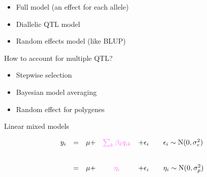 \documentclass[12pt]{article}
\newcommand{\headsize}{\fontsize{35}{35} \selectfont}
\newcommand{\textsize}{\fontsize{30}{35} \selectfont}
\newcommand{\smallsize}{\fontsize{25}{30} \selectfont}
\newcommand{\smallersize}{\fontsize{20}{25} \selectfont}
\begin{document}
\hfill \begin{minipage}{9in}
\color{myblue} \smallersize
\begin{itemize}
\item Full model (an effect for each allele)
\item Diallelic QTL model
\item Random effects model (like BLUP)
\end{itemize}
\end{minipage}

\vspace{20mm}

\color{mywhite}
\smallsize

\hfill \begin{minipage}{9.5in}
How to account for multiple QTL?

\vspace{10mm}

\hfill \begin{minipage}{9in}
\color{myblue} \smallersize
\begin{itemize}
\item Stepwise selection
\item Bayesian model averaging
\item Random effect for polygenes
\end{itemize}
\end{minipage}

\end{minipage}








\newpage

\headsize \color{myyellow}
\hfill\begin{minipage}{5.75in}
\centering
Linear mixed models
\end{minipage}


\vspace{3cm}

\color{mywhite} \textsize

$$\begin{array}{lllcl@{\qquad}l}
  y_i & = & \mu + & \textstyle{{\color{mypink} \sum_k \beta_k q_{ik}}} & + \epsilon_i
               & \epsilon_i \sim \text{N}(0, \sigma^2_e) \\[24pt]
  & = & \mu + & {\color{mypink} \eta_i} & + \epsilon_i & \eta_i \sim \text{N}(0, \sigma^2_p)
\end{array}$$

\vspace{2cm}
\end{document}
